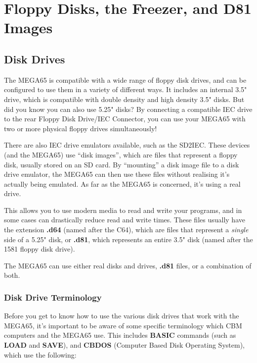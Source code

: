 \chapter{Floppy Disks, the Freezer, and D81 Images}
\label{cha:freezer}


\section{Disk Drives}
The MEGA65 is compatible with a wide range of floppy disk drives, and can be configured to use them in a variety
of different ways. It includes an internal 3.5" drive, which is compatible with double density and high density
3.5" disks. But did you know you can also use 5.25" disks? By connecting a compatible IEC drive to the rear
Floppy Disk Drive/IEC Connector, you can use your MEGA65 with two or more physical floppy drives simultaneously!

There are also IEC drive emulators available, such as the SD2IEC. These devices
(and the MEGA65) use ``disk images'', which are files that represent a floppy disk, usually stored on an SD card.
By ``mounting'' a disk image file to a disk drive emulator, the MEGA65 can then use these files without realising it's
actually being emulated. As far as the MEGA65 is concerned, it's using a real drive.

This allows you to use modern media to read and write your programs, and in some cases can drastically reduce
read and write times. These files usually have the extension {\bf .d64} (named after the C64), which are files that
represent a {\it single} side of a 5.25" disk, or {\bf .d81}, which represents an entire 3.5" disk (named after the
1581 floppy disk drive).

The MEGA65 can use either real disks and drives, {\bf .d81} files, or a combination of both.

\subsection{Disk Drive Terminology}
Before you get to know how to use the various disk drives that work with the MEGA65, it's important to be aware
of some specific terminology which CBM computers and the MEGA65 use. This includes {\bf BASIC} commands (such as
{\bf LOAD} and {\bf SAVE}), and {\bf CBDOS} (Computer Based Disk Operating System), which use the following:

